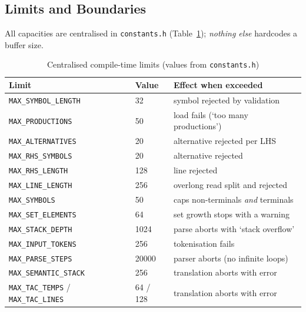 \documentclass[12pt,a4paper,oneside,openany]{report}
\newcommand{\code}[1]{\texttt{#1}}
\begin{document}
\subsection{Limits and Boundaries}
\label{sec:limitsd}
All capacities are centralised in \code{constants.h}
(Table~\ref{tab:limits}); \emph{nothing else} hardcodes a buffer size.

\begin{table}[h]
  \caption{Centralised compile-time limits (values from \code{constants.h})}
  \label{tab:limits}
  \small
  \begin{tabularx}{\textwidth}{p{4.6cm}p{1.4cm}X}
    \toprule
    \textbf{Limit} & \textbf{Value} & \textbf{Effect when exceeded} \\
    \midrule
    \code{MAX\_SYMBOL\_LENGTH} & 32 & symbol rejected by validation \\
    \code{MAX\_PRODUCTIONS} & 50 & load fails (`too many productions') \\
    \code{MAX\_ALTERNATIVES} & 20 & alternative rejected per LHS \\
    \code{MAX\_RHS\_SYMBOLS} & 20 & alternative rejected \\
    \code{MAX\_RHS\_LENGTH} & 128 & line rejected \\
    \code{MAX\_LINE\_LENGTH} & 256 & overlong read split and rejected \\
    \code{MAX\_SYMBOLS} & 50 & caps non-terminals \emph{and} terminals \\
    \code{MAX\_SET\_ELEMENTS} & 64 & set growth stops with a warning \\
    \code{MAX\_STACK\_DEPTH} & 1024 & parse aborts with `stack overflow' \\
    \code{MAX\_INPUT\_TOKENS} & 256 & tokenisation fails \\
    \code{MAX\_PARSE\_STEPS} & 20000 & parser aborts (no infinite loops) \\
    \code{MAX\_SEMANTIC\_STACK} & 256 & translation aborts with error \\
    \code{MAX\_TAC\_TEMPS} / \code{MAX\_TAC\_LINES} & 64 / 128 & translation
    aborts with error \\
    \bottomrule
  \end{tabularx}
\end{table}




\end{document}

